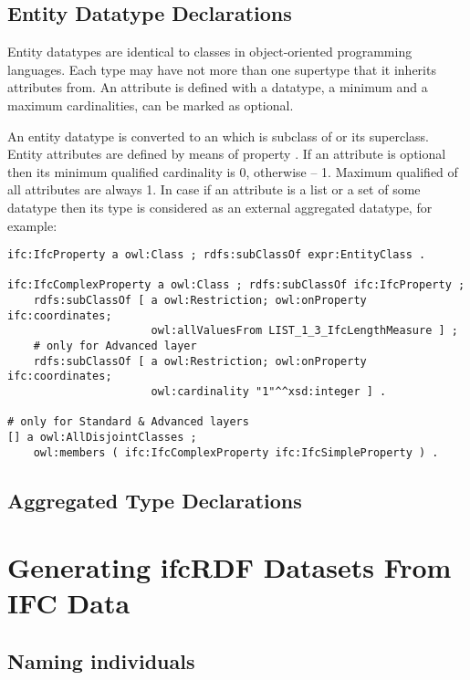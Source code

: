 \subsection{Entity Datatype Declarations}
\label{subsec:ifcOWL-entity-types}

Entity data\-types are identical to classes in object-oriented programming languages. Each type may have not more than one super\-type that it inherits attributes from. An attribute is defined with a data\-type, a minimum and a maximum cardinalities, can be marked as optional.

\begin{ontologyRule}An entity data\-type is converted to an  which is subclass of  or its superclass. Entity attributes are defined by means of property . If an attribute is optional then its minimum qualified cardinality is 0, otherwise -- 1. Maximum qualified of all attributes are always 1. In case if an attribute is a list or a set of some data\-type then its type is considered as an external aggregated data\-type, for example:
\begin{lstlisting}
ifc:IfcProperty a owl:Class ; rdfs:subClassOf expr:EntityClass .

ifc:IfcComplexProperty a owl:Class ; rdfs:subClassOf ifc:IfcProperty ;
    rdfs:subClassOf [ a owl:Restriction; owl:onProperty ifc:coordinates;
                      owl:allValuesFrom LIST_1_3_IfcLengthMeasure ] ;
    # only for Advanced layer
    rdfs:subClassOf [ a owl:Restriction; owl:onProperty ifc:coordinates;
                      owl:cardinality "1"^^xsd:integer ] .

# only for Standard & Advanced layers
[] a owl:AllDisjointClasses ;
    owl:members ( ifc:IfcComplexProperty ifc:IfcSimpleProperty ) .
\end{lstlisting}
\end{ontologyRule}


\subsection{Aggregated Type Declarations}
\label{subsec:ifcOWL-aggregated-types}





\section{Generating ifcRDF Datasets From IFC Data}


\subsection{Naming individuals}
\label{ifcRDF:naming-individuals}